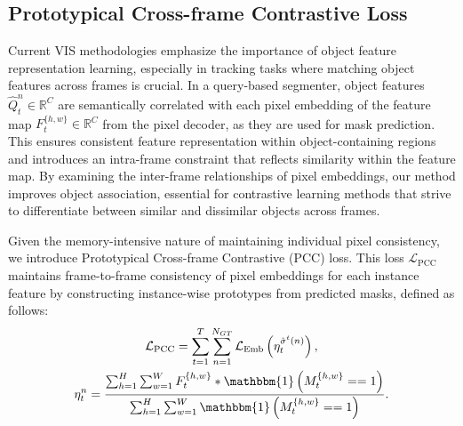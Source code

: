 \documentclass[10pt,twocolumn,letterpaper]{article}
\begin{document}



\subsection{Prototypical Cross-frame Contrastive Loss}
\label{sec:pcfl}
Current VIS methodologies emphasize the importance of object feature representation learning, especially in tracking tasks where matching object features across frames is crucial. In a query-based segmenter, object features $\hat{Q}_{t}^{n} \in \mathbb{R}^C$ are semantically correlated with each pixel embedding of the feature map $F_{t}^{\{h,w\}} \in \mathbb{R}^C$ from the pixel decoder, as they are used for mask prediction.
This ensures consistent feature representation within object-containing regions and introduces an intra-frame constraint that reflects similarity within the feature map. By examining the inter-frame relationships of pixel embeddings, our method improves object association, essential for contrastive learning methods that strive to differentiate between similar and dissimilar objects across frames.


Given the memory-intensive nature of maintaining individual pixel consistency, we introduce Prototypical Cross-frame Contrastive (PCC) loss. This loss $\mathcal{L}_{\text{PCC}}$ maintains frame-to-frame consistency of pixel embeddings for each instance feature by constructing instance-wise prototypes from predicted masks, defined as follows:
\begin{equation}
\label{eq:PCCL_loss}
\begin{gathered}
\mathcal{L}_{\text {PCC}} = \sum_{t=1}^{T} \sum_{n=1}^{N_{GT}} \mathcal{L}_{\text {Emb}} \left(\eta_{t}^{\hat{\sigma}^{t}(n)}\right), \\
\eta_{t}^{n} = \frac{\sum_{h=1}^H \sum_{w=1}^W F_{t}^{\{h,w\}} * \mathbbm{1}\left(M_{t}^{\{h,w\}}==1\right)}{\sum_{h=1}^H \sum_{w=1}^W \mathbbm{1}\left(M_{t}^{\{h,w\}}==1\right)}.
\end{gathered}
\end{equation}
\end{document}
